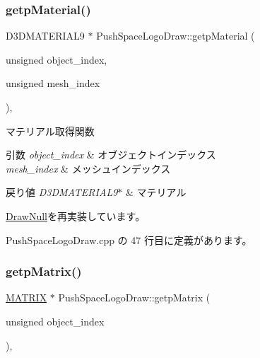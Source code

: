 \subsubsection{\texorpdfstring{getp\+Material()}{getpMaterial()}}
{\footnotesize\ttfamily D3\+D\+M\+A\+T\+E\+R\+I\+A\+L9 $\ast$ Push\+Space\+Logo\+Draw\+::getp\+Material (\begin{DoxyParamCaption}\item[{unsigned}]{object\+\_\+index,  }\item[{unsigned}]{mesh\+\_\+index }\end{DoxyParamCaption})\hspace{0.3cm}{\ttfamily [override]}, {\ttfamily [virtual]}}



マテリアル取得関数 


\begin{DoxyParams}{引数}
{\em object\+\_\+index} & オブジェクトインデックス \\
\hline
{\em mesh\+\_\+index} & メッシュインデックス \\
\hline
\end{DoxyParams}

\begin{DoxyRetVals}{戻り値}
{\em D3\+D\+M\+A\+T\+E\+R\+I\+A\+L9$\ast$} & マテリアル \\
\hline
\end{DoxyRetVals}


\mbox{\hyperlink{class_draw_null_a0c1efe55fea325ad277594be6fe1e938}{Draw\+Null}}を再実装しています。



 Push\+Space\+Logo\+Draw.\+cpp の 47 行目に定義があります。

\mbox{\label{class_push_space_logo_draw_a9e0875967651293ef97713477334bc2e}} 
\subsubsection{\texorpdfstring{getp\+Matrix()}{getpMatrix()}}
{\footnotesize\ttfamily \mbox{\hyperlink{_matrix_8h_a032295cd9fb1b711757c90667278e744}{M\+A\+T\+R\+IX}} $\ast$ Push\+Space\+Logo\+Draw\+::getp\+Matrix (\begin{DoxyParamCaption}\item[{unsigned}]{object\+\_\+index }\end{DoxyParamCaption})\hspace{0.3cm}{\ttfamily [override]}, {\ttfamily [virtual]}}



